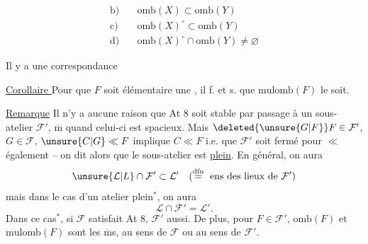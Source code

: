 
\[
\begin{aligned}
\text{b)}\quad&\mathrm{omb}(X)\subset\mathrm{omb}(Y)\\
\text{c)}\quad&\mathrm{omb}(X)^\circ\subset\mathrm{omb}(Y)\\
\text{d)}\quad&\mathrm{omb}(X)^\circ\cap\mathrm{omb}(Y)\ne\varnothing
\end{aligned}
\]

Il y a une correspondance 

\uline{Corollaire } Pour que $F$ soit élémentaire  une , il f. et s. que $\mathrm{mulomb}(F)$ le soit.

\uline{Remarque} Il n'y a aucune raison que At 8 soit stable par passage à un sous-atelier $\mathcal F'$, $\overline{\mathrm m}$ quand celui-ci est spacieux. Mais   $\deleted{\unsure{G|F}}F\in\mathcal F'$, $G\in\mathcal F$, $\unsure{C|G}\ll F$ implique $C\ll F$ i.e. que $\mathcal F'$ soit fermé pour $\ll$ également -- on dit alors que le sous-atelier est \uline{plein}. En général, on aura
\[
\unsure{\mathcal L|L}\cap\mathcal F'\subset\mathcal L'\quad(\mathrel{\overset{\mathrm{dfn}}{=}}\text{ ens des lieux de }\mathcal F')
\]
mais dans le cas d'un atelier plein$^{*}$, on aura
\[
\mathcal L\cap\mathcal F'=\mathcal L'.
\]
Dans ce cas$^{*}$, si $\mathcal F$ satisfait At 8, $\mathcal F'$ aussi. De plus,  pour $F\in\mathcal F'$, $\mathrm{omb}(F)$ et $\mathrm{mulomb}(F)$ sont les $\overline{\mathrm m}$s, au sens de $\mathcal F$ ou au sens de $\mathcal F'$.
